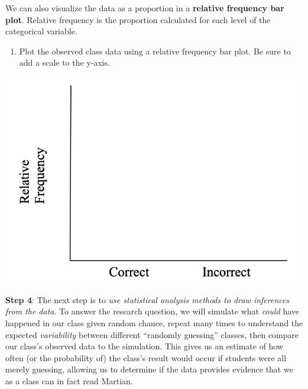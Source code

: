 \documentclass[
]{report}
\providecommand{\tightlist}{%
  \setlength{\itemsep}{0pt}\setlength{\parskip}{0pt}}
\begin{document}
We can also visualize the data as a proportion in a \textbf{relative frequency bar plot}. Relative frequency is the proportion calculated for each level of the categorical variable.

\begin{enumerate}
\def\labelenumi{\arabic{enumi}.}
\setcounter{enumi}{7}
\tightlist
\item
  Plot the observed class data using a relative frequency bar plot. Be sure to add a scale to the y-axis.
\end{enumerate}

\begin{center}\includegraphics[width=0.4\linewidth]{images/relative_barplot_martian} \end{center}

\textbf{Step 4}: The next step is to \emph{use statistical analysis methods to draw inferences from the data}. To answer the research question, we will simulate what \emph{could} have happened in our class given random chance, repeat many times to understand the expected \emph{variability} between different ``randomly guessing'' classes, then compare our class's observed data to the simulation. This gives us an estimate of how often (or the probability of) the class's result would occur if students were all merely guessing, allowing us to determine if the data provides evidence that we as a class can in fact read Martian.
\end{document}
